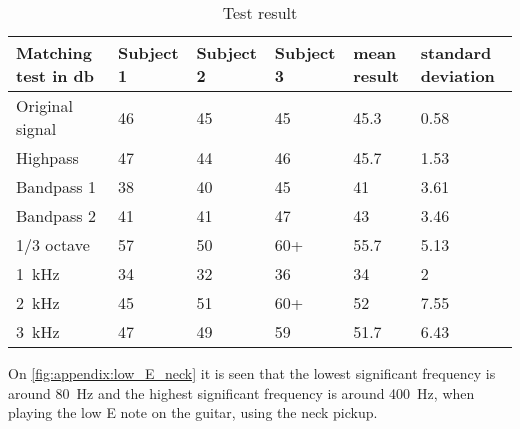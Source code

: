 \begin{table}[H]
\caption{Test result}
\begin{tabular}{l|lll|ll}
Matching test in \si{\decibel}       & Subject 1 & Subject 2 & Subject 3 & mean result & standard deviation \\ \hline
Original signal         & 46        & 45        & 45        & 45.3        & 0.58               \\
Highpass         & 47        & 44        & 46        & 45.7        & 1.53               \\
Bandpass 1         & 38        & 40        & 45        & 41          & 3.61               \\
Bandpass 2        & 41        & 41        & 47        & 43          & 3.46               \\
1/3 octave & 57        & 50        & 60+       & 55.7        & 5.13               \\
\SI{1}{\kilo\hertz}                   & 34        & 32        & 36        & 34          & 2                  \\
\SI{2}{\kilo\hertz}                  & 45        & 51        & 60+       & 52          & 7.55               \\
\SI{3}{\kilo\hertz}                  & 47        & 49        & 59        & 51.7        &  6.43                 
\end{tabular}
\end{table}

On  \autoref{fig:appendix:low_E_neck} it is seen that the lowest significant frequency is around \SI{80}{\hertz} and the highest significant frequency is around \SI{400}{\hertz}, when playing the low E note on the guitar, using the neck pickup.

